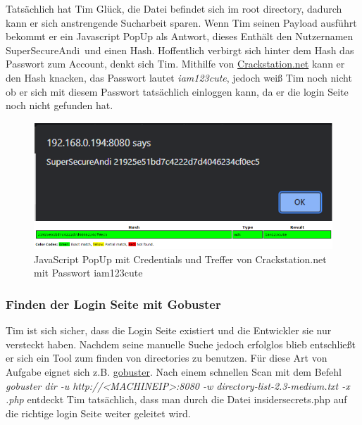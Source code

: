 \documentclass[10pt, a4paper,onecolumn ,titlepage]{article}
\begin{document}
    \noindent
    Tatsächlich hat Tim Glück, die Datei befindet sich im root directory, dadurch kann er sich anstrengende Sucharbeit sparen. Wenn Tim seinen Payload ausführt
    bekommt er ein Javascript PopUp als Antwort, dieses Enthält den Nutzernamen \\ \glqq SuperSecureAndi\grqq\ und einen Hash. Hoffentlich verbirgt sich hinter dem Hash das Passwort
    zum Account, denkt sich Tim. Mithilfe von \href{https://crackstation.net/}{Crackstation.net} kann er den Hash knacken, das Passwort lautet \textit{iam123cute}, jedoch weiß Tim noch nicht ob er sich mit
    diesem Passwort tatsächlich einloggen kann, da er die login Seite noch nicht gefunden hat.

    \begin{figure}[H]
        \centering
        \includegraphics[width=1\textwidth]{VM1_Bilder/XSSHash.PNG}
        \caption{JavaScript PopUp mit Credentials und Treffer von Crackstation.net mit Passwort iam123cute}
        \label{fig:XSSHash}
    \end{figure}

    \subsubsection{Finden der Login Seite mit Gobuster}
    Tim ist sich sicher, dass die Login Seite existiert und die Entwickler sie nur versteckt haben. Nachdem seine manuelle Suche jedoch erfolglos blieb entschließt er
    sich ein Tool zum finden von directories zu benutzen. Für diese Art von Aufgabe eignet sich z.B. \href{https://github.com/OJ/gobuster}{gobuster}.
    Nach einem schnellen Scan mit dem Befehl \textit{gobuster dir -u http://<MACHINEIP>:8080 -w directory-list-2.3-medium.txt -x .php}
    entdeckt Tim tatsächlich, dass man durch die Datei insidersecrets.php auf die richtige login Seite weiter geleitet wird.
\end{document}

